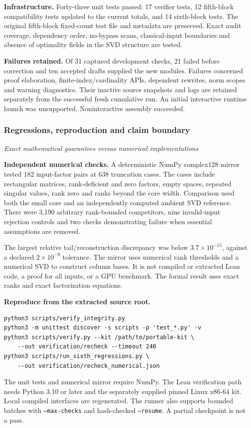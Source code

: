 \textbf{Infrastructure.} Forty-three unit tests passed: 17 verifier tests, 12 fifth-block compatibility tests updated to the current totals, and 14 sixth-block tests. The original fifth-block fixed-count test file and metadata are preserved. Exact audit coverage, dependency order, no-bypass scans, classical-input boundaries and absence of optimality fields in the SVD structure are tested.

\textbf{Failures retained.} Of 31 captured development checks, 21 failed before correction and ten accepted drafts supplied the new modules. Failures concerned proof elaboration, finite-index/cardinality APIs, dependent rewrites, norm scopes and warning diagnostics. Their inactive source snapshots and logs are retained separately from the successful fresh cumulative run. An initial interactive runtime launch was unsupported. Noninteractive assembly succeeded.



\subsubsection*{Regressions, reproduction and claim boundary}\label{history:supp6:subsection:007}\textit{Exact mathematical guarantees versus numerical implementations}\par
\textbf{Independent numerical checks.} A deterministic NumPy complex128 mirror tested 182 input-factor pairs at 638 truncation cases. The cases include rectangular matrices, rank-deficient and zero factors, empty spaces, repeated singular values, rank zero and ranks beyond the core width. Comparison used both the small core and an independently computed ambient SVD reference. There were 3,190 arbitrary rank-bounded competitors, nine invalid-input rejection controls and two checks demonstrating failure when essential assumptions are removed.

The largest relative tail/reconstruction discrepancy was below $3.7\times10^{-15}$, against a declared $2\times10^{-9}$ tolerance. The mirror uses numerical rank thresholds and a numerical SVD to construct column bases. It is not compiled or extracted Lean code, a proof for all inputs, or a GPU benchmark. The formal result uses exact ranks and exact factorization equations.

\textbf{Reproduce from the extracted source root.}
\begin{verbatim}
python3 scripts/verify_integrity.py
python3 -m unittest discover -s scripts -p 'test_*.py' -v
python3 scripts/verify.py --kit /path/to/portable-kit \
    --out verification/recheck --timeout 240
python3 scripts/run_sixth_regressions.py \
    --out verification/recheck_numerical.json
\end{verbatim}
The unit tests and numerical mirror require NumPy. The Lean verification path needs Python 3.10 or later and the separately supplied pinned Linux x86-64 kit. Local compiled interfaces are regenerated. The runner also supports bounded batches with \texttt{--max-checks} and hash-checked \texttt{--resume}. A partial checkpoint is not a pass.

